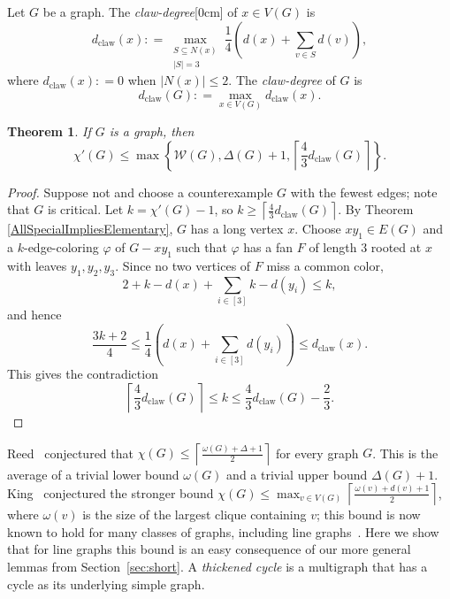 \documentclass[12pt]{article}
\newcommand{\aside}[1]{\marginnote{\scriptsize{#1}}[0cm]}
\theoremstyle{plain}
\newtheorem{thm}{Theorem}
\theoremstyle{definition}
\theoremstyle{remark}
\newcommand{\fancy}[1]{\mathcal{#1}}
\newcommand{\W}{\fancy{W}}
\newcommand{\set}[1]{\left\{ #1 \right\}}
\newcommand{\card}[1]{\left|#1\right|}
\newcommand{\ceil}[1]{\left\lceil#1\right\rceil}
\newcommand{\irange}[1]{\left[#1\right]}
\newcommand{\parens}[1]{\left( #1 \right)}
\newcommand{\DefinedAs}{\mathrel{\mathop:}=}
\newcommand{\dclaw}[1]{d_{\text{claw}}\left( #1 \right)}
\newcommand{\vph}{\varphi}
\def\aftermath{\par\vspace{-\belowdisplayskip}\vspace{-\parskip}\vspace{-\baselineskip}}
\begin{document}
Let $G$ be a graph.  The \emph{claw-degree}\aside{claw-degree} of $x \in V(G)$ is 
\[\dclaw{x} \DefinedAs \max_{\substack{S \subseteq N(x) \\ \card{S} = 3}}\frac14 \parens{d(x) + \sum_{v \in S} d(v)},\]
where $\dclaw{x} \DefinedAs 0$ when $\card{N(x)} \le 2$.
The \emph{claw-degree} of $G$ is 
\[\dclaw{G} \DefinedAs \max_{x \in V(G)} \dclaw{x}.\]
\begin{thm}
\label{EasyBound}
If $G$ is a graph, then
\[\chi'(G) \le \max\set{\W(G), \Delta(G) + 1, \ceil{\frac43\dclaw{G}}}.\]
\end{thm}
\begin{proof}
Suppose not and choose a counterexample $G$ with the fewest edges; note that $G$
is critical. 
Let $k=\chi'(G)-1$, so $k \ge \ceil{\frac43\dclaw{G}}$. 
By Theorem \ref{AllSpecialImpliesElementary}, $G$ has a long vertex $x$.
Choose $xy_1 \in E(G)$ and a $k$-edge-coloring $\vph$ of $G - xy_1$ such that
$\vph$ has a fan $F$ of length $3$ rooted at $x$ with leaves $y_1, y_2, y_3$.  
Since no two vertices of $F$ miss a common color,
\[2 + k - d(x) + \sum_{i \in \irange{3}} k-d(y_i) \le k,\]
and hence
\[
\frac{3k+2}{4}
\le 
\frac14\parens{d(x) + \sum_{i \in \irange{3}} d(y_i)} 
\le 
\dclaw{x}.
\]
This gives the contradiction
\[\ceil{\frac43\dclaw{G}} \le k \le \frac43\dclaw{G} - \frac23.\]
\aftermath
\end{proof}

Reed~\cite{Reed1998omega} conjectured that $\chi(G)\le
\ceil{\frac{\omega(G)+\Delta+1}2}$ for every
graph $G$.  This is the average of a trivial lower bound $\omega(G)$ and a
trivial upper bound $\Delta(G)+1$.  King~\cite{King-diss} conjectured the stronger
bound $\chi(G)\le \max_{v\in V(G)}\ceil{\frac{\omega(v)+d(v)+1}2}$, where
$\omega(v)$ is the size of the largest clique containing $v$; this bound is now known
to hold for many classes of graphs, including line graphs~\cite{CKPS}.  Here we
show that for line graphs this bound is an easy consequence of our more general
lemmas from Section~\ref{sec:short}.  A \emph{thickened cycle} is a multigraph
that has a cycle as its underlying simple graph.
\end{document}
